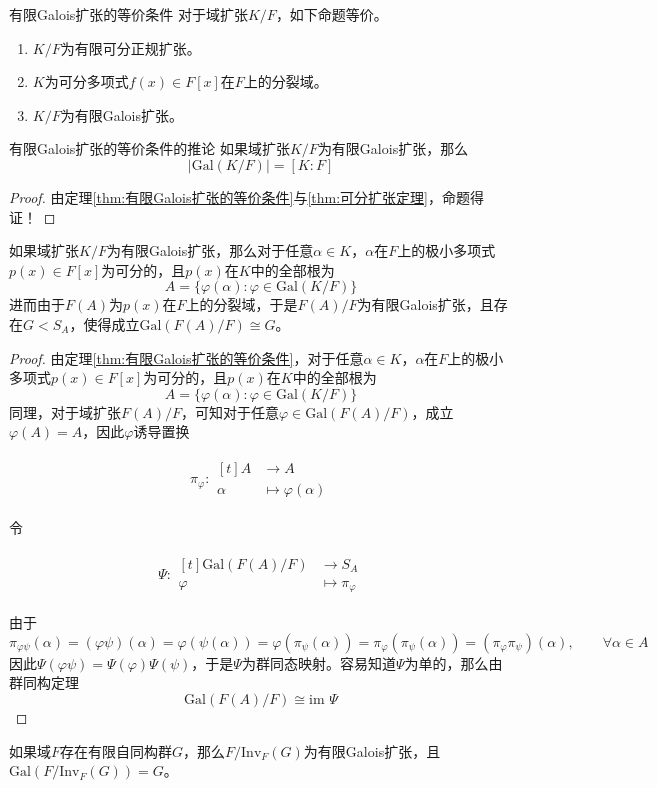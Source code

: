 \documentclass[lang = cn, scheme = chinese, thmcnt = section]{elegantbook}
\newcommand{\im}{\text{im }}           %
\newcommand{\function}[5]{
	\begin{align*}
		#1:\begin{aligned}[t]
			#2 &\longrightarrow #3\\
			#4 &\longmapsto #5
		\end{aligned}
	\end{align*}
}                                     %
\begin{document}
\begin{theorem}{}{有限Galois扩张的等价条件}
	对于域扩张$K/F$，如下命题等价。
	\begin{enumerate}
		\item $K/F$为有限可分正规扩张。
		\item $K$为可分多项式$f(x)\in F[x]$在$F$上的分裂域。
		\item $K/F$为有限Galois扩张。
	\end{enumerate}
\end{theorem}

\begin{corollary}{}{有限Galois扩张的等价条件的推论}
	如果域扩张$K/F$为有限Galois扩张，那么
	$$
	|\text{Gal}(K/F)|=[K:F]
	$$
\end{corollary}

\begin{proof}
	由定理\ref{thm:有限Galois扩张的等价条件}与\ref{thm:可分扩张定理}，命题得证！
\end{proof}

\begin{corollary}
	如果域扩张$K/F$为有限Galois扩张，那么对于任意$\alpha\in K$，$\alpha$在$F$上的极小多项式$p(x)\in F[x]$为可分的，且$p(x)$在$K$中的全部根为
	$$
	A=\{ \varphi(\alpha):\varphi\in \text{Gal}(K/F) \}
	$$
	进而由于$F(A)$为$p(x)$在$F$上的分裂域，于是$F(A)/F$为有限Galois扩张，且存在$G<S_A$，使得成立$\text{Gal}(F(A)/F)\cong G$。
\end{corollary}

\begin{proof}
	由定理\ref{thm:有限Galois扩张的等价条件}，对于任意$\alpha\in K$，$\alpha$在$F$上的极小多项式$p(x)\in F[x]$为可分的，且$p(x)$在$K$中的全部根为
	$$
	A=\{ \varphi(\alpha):\varphi\in \text{Gal}(K/F) \}
	$$
	同理，对于域扩张$F(A)/F$，可知对于任意$\varphi\in \text{Gal}(F(A)/F)$，成立$\varphi(A)=A$，因此$\varphi$诱导置换
	\function{\pi_\varphi}{A}{A}{\alpha}{\varphi(\alpha)}
	令
	\function{\Psi}{\text{Gal}(F(A)/F)}{S_A}{\varphi}{\pi_\varphi}
	由于
	$$
	\pi_{\varphi\psi}(\alpha)=(\varphi\psi)(\alpha) = \varphi(\psi(\alpha))= \varphi(\pi_{\psi}(\alpha)) = \pi_{\varphi}(\pi_{\psi}(\alpha))= (\pi_\varphi\pi_\psi)(\alpha),\qquad 
	\forall\alpha\in A
	$$
	因此$\Psi(\varphi\psi)=\Psi(\varphi)\Psi(\psi)$，于是$\Psi$为群同态映射。容易知道$\Psi$为单的，那么由群同构定理
	$$
	\text{Gal}(F(A)/F)\cong \im\Psi
	$$
\end{proof}

\begin{proposition}
	如果域$F$存在有限自同构群$G$，那么$F/\text{Inv}_F(G)$为有限Galois扩张，且$\text{Gal}(F/\text{Inv}_F(G))=G$。
\end{proposition}
\end{document}
